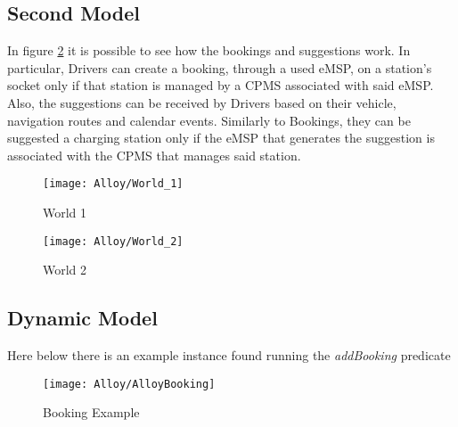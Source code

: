 \subsection{Second Model}
\label{subsec:secondModel}
In figure \ref{fig:World_2} it is possible to see how the bookings and suggestions work. In particular, Drivers can create a booking, through a used eMSP, on a station's socket only if that station is managed by a CPMS associated with said eMSP. Also, the suggestions can be received by Drivers based on their vehicle, navigation routes and calendar events. Similarly to Bookings, they can be suggested a charging station only if the eMSP that generates the suggestion is associated with the CPMS that manages said station.
\begin{figure}[H]
    \begin{center}
    \texttt{[image: Alloy/World\_1]}
    \caption{World 1}
    \label{fig:World_1}
    \end{center}
\end{figure}
\begin{figure}[H]
    \begin{center}
    \texttt{[image: Alloy/World\_2]}
    \caption{World 2}
    \label{fig:World_2}
    \end{center}
\end{figure}
\subsection{Dynamic Model}
Here below there is an example instance found running the \textit{addBooking} predicate
\label{subsec:dynamicModel}
\begin{figure}[H]
    \begin{center}
    \texttt{[image: Alloy/AlloyBooking]}
    \caption{Booking Example}
    \label{fig:bookingExample}
    \end{center}
\end{figure}
